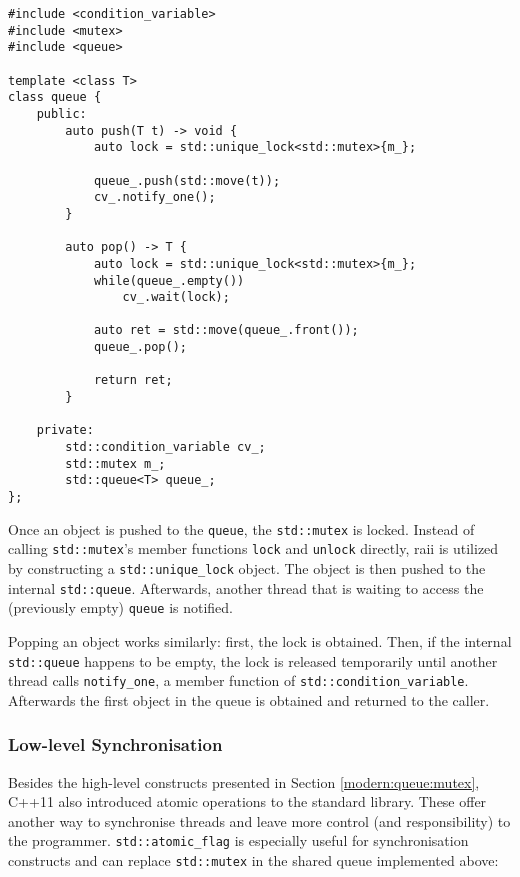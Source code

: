 \begin{verbatim}
#include <condition_variable>
#include <mutex>
#include <queue>

template <class T>
class queue {
    public:
        auto push(T t) -> void {
            auto lock = std::unique_lock<std::mutex>{m_};
            
            queue_.push(std::move(t));
            cv_.notify_one();
        }
        
        auto pop() -> T {
            auto lock = std::unique_lock<std::mutex>{m_};
            while(queue_.empty())
                cv_.wait(lock);
                
            auto ret = std::move(queue_.front());
            queue_.pop();
            
            return ret;
        }
        
    private:
        std::condition_variable cv_;
        std::mutex m_;
        std::queue<T> queue_;
};
\end{verbatim}

\noindent Once an object is pushed to the \texttt{queue}, the \texttt{std::mutex} is locked. Instead of calling \texttt{std::mutex}'s member functions \texttt{lock} and \texttt{unlock} directly, \gls{raii} is utilized by constructing a \texttt{std::unique\_lock} object. The object is then pushed to the internal \texttt{std::queue}. Afterwards, another thread that is waiting to access the (previously empty) \texttt{queue} is notified.

Popping an object works similarly: first, the lock is obtained. Then, if the internal \texttt{std::queue} happens to be empty, the lock is released temporarily until another thread calls \texttt{notify\_one}, a member function of \texttt{std::condition\_variable}. Afterwards the first object in the queue is obtained and returned to the caller.

\subsubsection{Low-level Synchronisation}\label{modern:queue:atomics}

Besides the high-level constructs presented in Section \ref{modern:queue:mutex}, C++11 also introduced atomic operations to the standard library. These offer another way to synchronise threads and leave more control (and responsibility) to the programmer. \texttt{std::atomic\_flag} is especially useful for synchronisation constructs and can replace \texttt{std::mutex} in the shared queue implemented above:

